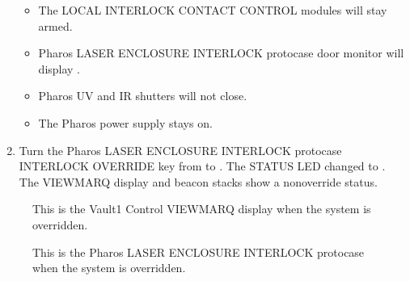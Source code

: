 \documentclass[letterpaper,10pt,english]{sphinxmanual}
\begin{document}
\begin{enumerate}
\begin{itemize}
\item {} 
\sphinxAtStartPar
The LOCAL INTERLOCK CONTACT CONTROL modules will stay armed.

\item {} 
\sphinxAtStartPar
Pharos LASER ENCLOSURE INTERLOCK protocase door monitor will display .

\item {} 
\sphinxAtStartPar
Pharos UV and IR shutters will not close.

\item {} 
\sphinxAtStartPar
The Pharos power supply stays on.

\end{itemize}

\item {} 
\sphinxAtStartPar
Turn the Pharos LASER ENCLOSURE INTERLOCK protocase INTERLOCK OVERRIDE key from  to .
The STATUS LED changed to .
The VIEWMARQ display and beacon stacks show a non\sphinxhyphen{}override status.

\end{enumerate}

\begin{figure}[htbp]
\centering
\capstart

\noindent{}
\caption{ This is the Vault\sphinxhyphen{}1 Control VIEWMARQ display when the system is overridden.}\label{\detokenize{testing_documentation/Vault-1_laser:id12}}\end{figure}

\begin{figure}[htbp]
\centering
\capstart

\noindent{}
\caption{ This is the Pharos LASER ENCLOSURE INTERLOCK protocase when the system is overridden.}\label{\detokenize{testing_documentation/Vault-1_laser:id13}}\end{figure}
\end{document}
